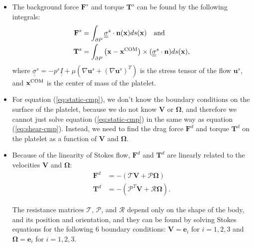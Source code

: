 \documentclass{article}
\newcommand{\tn}{\textnormal}
\newcommand{\vect}[1]{\boldsymbol{\mathbf{#1}}}
\newcommand{\mat}[1]{\underline{\underline{#1}}}
\begin{document}
{\begin{itemize}
  equation (\ref{eq:shear-cmp}) and integrating the traction over the
  surface of the platelet.
\item The background force $\vect{F}^s$ and torque $\vect{T}^s$ can be
  found by the following integrals:
  \begin{align}
    \vect{F}^s &= \int_{\partial P} \mat{\sigma}^s \cdot
                 \vect{n}(\vect{x}) ds(\vect{x}) \quad
                 \tn{and} \label{eq:force-int} \\
    \vect{T}^s &= \int_{\partial P} \left(\vect{x} -
                 \vect{x}^\tn{COM}\right) \times (\mat{\sigma}^s \cdot
                 \vect{n}) ds(\vect{x}), \label{eq:torque-int}
  \end{align}
  where
  $\mat{\sigma}^s = -p^s \mat{I} + \mu \left(\nabla \vect{u}^s +
    (\nabla \vect{u}^s)^T\right)$ is the stress tensor of the flow
  $\vect{u}^s$, and $\vect{x}^\tn{COM}$ is the center of mass of the
  platelet.
\item For equation (\ref{eq:static-cmp}), we don't know the boundary
  conditions on the surface of the platelet, because we do not know
  $\vect{V}$ or $\vect{\Omega}$, and therefore we cannot just solve
  equation (\ref{eq:static-cmp}) in the same way as equation
  (\ref{eq:shear-cmp}). Instead, we need to find the drag force
  $\vect{F}^d$ and torque $\vect{T}^d$ on the platelet as a function
  of $\vect{V}$ and $\vect{\Omega}$. 
\item Because of the linearity of Stokes flow, $\vect{F}^d$ and
  $\vect{T}^d$ are linearly related to the velocities $\vect{V}$ and
  $\vect{\Omega}$: 
  \begin{align}
    \vect{F}^d &= -(\mathcal{T} \vect{V} + \mathcal{P}
                 \vect{\Omega}) \label{eq:res1} \\
    \vect{T}^d &= -(\mathcal{P}^T \vect{V} + \mathcal{R}
                 \vect{\Omega}). \label{eq:res2}
  \end{align}

  The resistance matrices $\mathcal{T}$, $\mathcal{P}$, and
  $\mathcal{R}$ depend only on the shape of the body, and its position
  and orientation, and they can be found by solving Stokes equations
  for the following 6 boundary conditions: $\vect{V} =
  \vect{e}_i$ for $i = 1, 2, 3$ and $\vect{\Omega} =
  \vect{e}_i$ for $i = 1, 2, 3$.


\end{itemize}}
\end{document}
